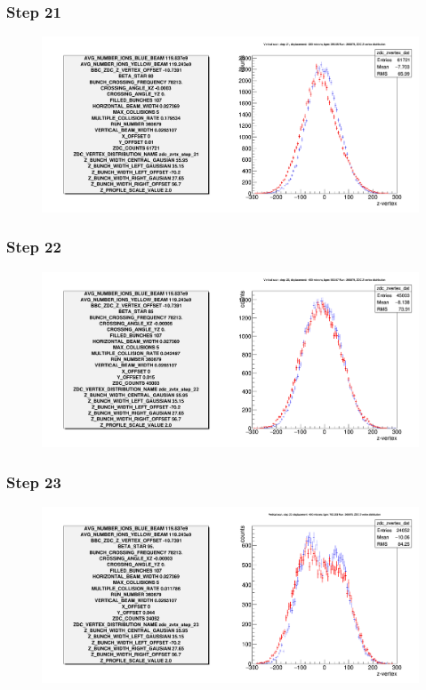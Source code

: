 \begin{frame}
  \frametitle{Step 21}
  \begin{figure}
    \includegraphics[width=\linewidth]{"./figures/tuned_simulation_step_21"}
    \caption{}
    \label{fig:step_21}
  \end{figure}
\end{frame}

\begin{frame}
  \frametitle{Step 22}
  \begin{figure}
    \includegraphics[width=\linewidth]{"./figures/tuned_simulation_step_22"}
    \caption{}
    \label{fig:step_22}
  \end{figure}
\end{frame}

\begin{frame}
  \frametitle{Step 23}
  \begin{figure}
    \includegraphics[width=\linewidth]{"./figures/tuned_simulation_step_23"}
    \caption{}
    \label{fig:step_23}
  \end{figure}
\end{frame}

